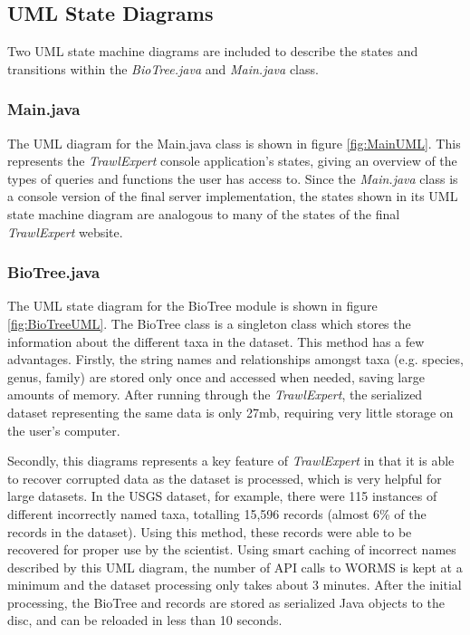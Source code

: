 \documentclass{article}
\begin{document}
\subsection{UML State Diagrams}
Two UML state machine diagrams are included to describe the states and transitions within the \textit{BioTree.java} and \textit{Main.java} class.

\subsubsection{Main.java}
The UML diagram for the Main.java class is shown in figure \ref{fig:MainUML}. This represents the \textit{TrawlExpert} console application's states, giving an overview of the types of queries and functions the user has access to. Since the \textit{Main.java} class is a console version of the final server implementation, the states shown in its UML state machine diagram are analogous to many of the states of the final \textit{TrawlExpert} website.
 
\subsubsection{BioTree.java}
The UML state diagram for the BioTree module is shown in figure \ref{fig:BioTreeUML}. The BioTree class is a singleton class which stores the information about the different taxa in the dataset. This method has a few advantages. Firstly, the string names and relationships amongst taxa (e.g. species, genus, family) are stored only once and accessed when needed, saving large amounts of memory. After running through the \textit{TrawlExpert}, the serialized dataset representing the same data is only 27mb, requiring very little storage on the user's computer.

Secondly, this diagrams represents a key feature of \textit{TrawlExpert} in that it is able to recover corrupted data as the dataset is processed, which is very helpful for large datasets. In the USGS dataset, for example, there were 115 instances of different incorrectly named taxa, totalling 15,596 records (almost 6\% of the records in the dataset). Using this method, these records were able to be recovered for proper use by the scientist. Using smart caching of incorrect names described by this UML diagram, the number of API calls to WORMS is kept at a minimum and the dataset processing only takes about 3 minutes. After the initial processing, the BioTree and records are stored as serialized Java objects to the disc, and can be reloaded in less than 10 seconds.
\end{document}
